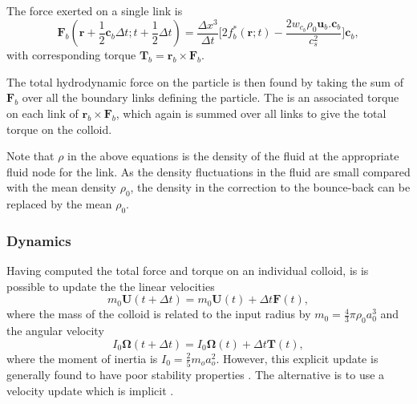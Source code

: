 The force exerted on a
single link is
\begin{equation}
\mathbf{F}_b(\mathbf{r} + {\scriptstyle\frac{1}{2}}\mathbf{c}_b\Delta t;
t + {\scriptstyle\frac{1}{2}}\Delta t) = \frac{\Delta x^3}{\Delta t}
\Big[ 2f_b^\ast(\mathbf{r}; t) - \frac{2w_{c_b}\rho_0 \mathbf{u}_b .
\mathbf{c}_b}{c_s^2} \Big] \mathbf{c}_b,
\label{eq:fb}
\end{equation}
with corresponding torque $\mathbf{T}_b = \mathbf{r}_b \times \mathbf{F}_b$.




The total hydrodynamic force on the particle is then found by taking
the sum of
$\mathbf{F}_b$ over all the boundary links defining the particle.
The is an associated torque on each link of $\mathbf{r}_b\times\mathbf{F}_b$,
which again is summed over all links to give the total torque on the colloid.

Note that $\rho$ in the above equations is the density of the fluid
at the appropriate fluid node for the link. As the density fluctuations
in the fluid are small compared with the mean density $\rho_0$, the
density in the correction to the bounce-back can be replaced by the
mean $\rho_0$.


\subsubsection{Dynamics}
Having computed the total force and torque on an individual colloid,
is is possible to update the the linear velocities
\begin{equation}
m_0 \mathbf{U}(t + \Delta t) = m_0 \mathbf{U}(t) + \Delta t \mathbf{F} (t),
\end{equation}
where the mass of the colloid is related to the input radius by
$m_0 = {\scriptstyle\frac{4}{3}}\pi\rho_0 a_0^3$ and the angular
velocity
\begin{equation}
I_0 \mathbf{\Omega} (t + \Delta t) = I_0 \mathbf{\Omega}(t) + \Delta t
\mathbf{T}(t),
\end{equation}
where the moment of inertia is $I_0 = {\scriptstyle\frac{2}{5}}m_o a_o^2$.
However, this explicit update is generally found to have poor stability
properties \cite{l94b, nl02}. The alternative is to use a velocity update
which is implicit \cite{heemels,nl02}.



